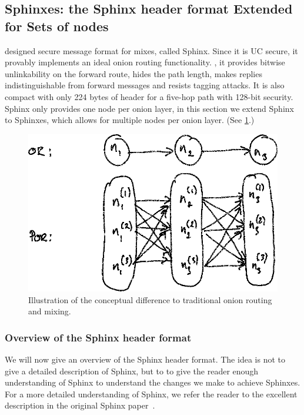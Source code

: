 \subsection{Sphinxes: the Sphinx header format Extended for Sets of nodes}%
\label{Sphinxes}

\Textcite{Sphinx} designed  secure message format for mixes, called 
Sphinx.
Since it is \ac{UC} secure, it provably implements an ideal onion routing 
functionality.
\Ie, it provides bitwise unlinkability on the forward route, hides the path 
length, makes replies indistinguishable from forward messages and resists 
tagging attacks.
It is also compact with only 224 bytes of header for a five-hop path with 
128-bit security.
Sphinx only provides one node per onion layer, in this section we extend Sphinx 
to Sphinxes, which allows for multiple nodes per onion layer.
(See \cref{fig:OR-POR}.)

\begin{figure}
  \includegraphics[width=\linewidth]{figures/OR-POR.png}
  \caption{\label{fig:OR-POR}%
    Illustration of the conceptual difference to traditional onion routing and 
    mixing.
  }
\end{figure}

\subsubsection{Overview of the Sphinx header format}

We will now give an overview of the Sphinx header format.
The idea is not to give a detailed description of Sphinx, but to to give the 
reader enough understanding of Sphinx to understand the changes we make to 
achieve Sphinxes.
For a more detailed understanding of Sphinx, we refer the reader to the 
excellent description in the original Sphinx paper~\cite{Sphinx}.

